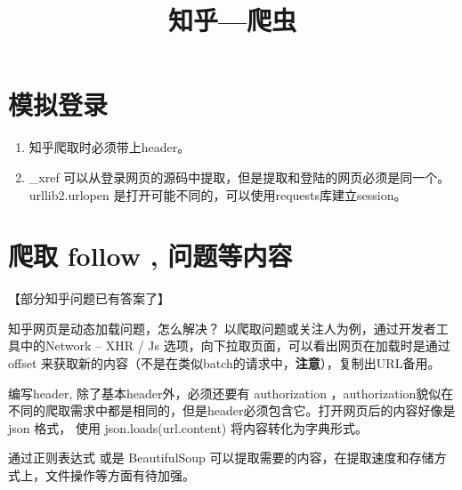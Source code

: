 \documentclass{article}
\title{知乎---爬虫}
\begin{document}
   \maketitle
   \section{模拟登录} 
  \begin{enumerate}
    \item 知乎爬取时必须带上header。
    \item \_xref 可以从登录网页的源码中提取，但是提取和登陆的网页必须是同一个。urllib2.urlopen 是打开可能不同的，可以使用requests库建立session。
  \end{enumerate}

    \section{爬取 follow , 问题等内容}
    【部分知乎问题已有答案了】

    知乎网页是动态加载问题，怎么解决？
    以爬取问题或关注人为例，通过开发者工具中的Network -- XHR / Js 选项，向下拉取页面，可以看出网页在加载时是通过 offset 来获取新的内容（不是在类似batch的请求中，\textbf{注意}），复制出URL备用。

    编写header, 除了基本header外，必须还要有 authorization ，authorization貌似在不同的爬取需求中都是相同的，但是header必须包含它。打开网页后的内容好像是 json 格式， 使用 json.loads(url.content) 将内容转化为字典形式。

    通过正则表达式 或是 BeautifulSoup 可以提取需要的内容，在提取速度和存储方式上，文件操作等方面有待加强。
      
    
\end{document}
